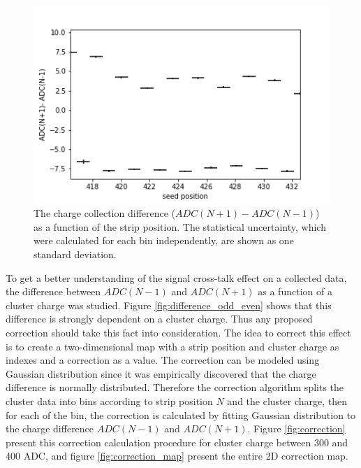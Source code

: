 \begin{figure}[htb]
\centering
\includegraphics[scale=0.5]{figures/eta/profile_0deg.png}
\caption{The charge collection difference ($ADC(N+1) - ADC(N-1)$) as a function of the strip position. The statistical uncertainty, which were calculated for each bin independently, are shown as one standard deviation. }
\label{fig:charge asymmetry profile}
\end{figure}

To get a better understanding of the signal cross-talk effect on a collected data, the difference between $ADC(N-1)$ and $ADC(N+1)$ as a function of a cluster charge was studied. Figure \ref{fig:difference_odd_even} shows that this difference is strongly dependent on a cluster charge. Thus any proposed correction should take this fact into consideration.  The idea to correct this effect is to create a two-dimensional map with a strip position and cluster charge as indexes and a correction as a value. The correction can be modeled using Gaussian distribution since it was empirically discovered that the charge difference is normally distributed.
Therefore the correction algorithm splits the cluster data into bins according to strip position $N$ and the cluster charge, then for each of the bin, the correction is calculated by fitting Gaussian distribution to the charge difference  $ADC(N-1)$ and $ADC(N+1)$. 
Figure \ref{fig:correction} present this correction calculation procedure for cluster charge between 300 and 400 ADC, and figure \ref{fig:correction_map} present the entire 2D correction map. 

